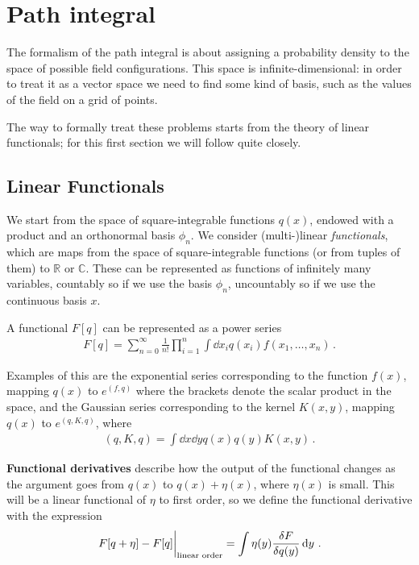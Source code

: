 \documentclass[main.tex]{subfiles}
\begin{document}
\section{Path integral} \label{sec:path-integral}

The formalism of the path integral is about assigning a probability density to the space of possible field configurations. 
This space is infinite-dimensional: in order to treat it as a vector space we need to find some kind of basis, such as the values of the field on a grid of points. 

The way to formally treat these problems starts from the theory of linear functionals; for this first section we will follow \textcite[]{zaidiFunctionalMethods1983} quite closely.

\subsection{Linear Functionals}


We start from the space of square-integrable functions \(q(x)\), endowed with a product and an orthonormal basis \(\phi _n\).
We consider (multi-)linear \emph{functionals}, which are maps from the space of square-integrable functions (or from tuples of them) to \(\mathbb{R}\) or \(\mathbb{C}\). 
These can be represented as functions of infinitely many variables, countably so if we use the basis \(\phi _n\), uncountably so if we use the continuous basis \(x\).

A functional \(F[q]\) can be represented as a power series 
%
\begin{align}
F[q] = \sum _{n=0}^{\infty } \frac{1}{n!} \prod_{i=1}^{n} \int \dd{x_i} q(x_i) f(x_1, \dots, x_n)
\,.
\end{align}

Examples of this are the exponential series corresponding to the function \(f(x)\), mapping \(q(x)\) to \(e^{(f, q)}\) where the brackets denote the scalar product in the space, and the Gaussian series corresponding to the kernel \(K(x, y)\), mapping \(q(x)\) to \(e^{(q, K, q)}\), where 
%
\begin{align}
(q, K, q) = \int \dd{x} \dd{y} q(x) q(y) K(x, y)
\,.
\end{align}

\textbf{Functional derivatives} describe how the output of the functional changes as the argument goes from \(q(x)\) to \(q(x) + \eta (x)\), where \(\eta (x)\) is small. 
This will be a linear functional of \(\eta \) to first order, so we define the functional derivative with the expression 
%
\begin{align}
\eval{F[q+\eta ] - F[q]}_{\text{linear order}} = \int \eta (y) \fdv{F}{q (y)} \dd{y}
\,.
\end{align}
\end{document}
